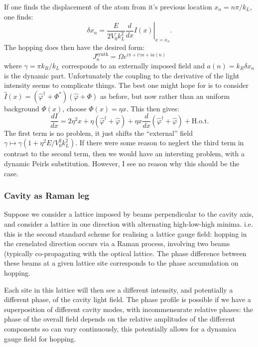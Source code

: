 \documentclass[twocolumn]{revtex4-1}
\begin{document}
If one finds the displacement of the atom from it's previous
location $x_n = n \pi/k_L$, one finds:
\begin{displaymath}
  \delta x_n = \frac{E}{2 V_0 k_L^2} \left. \frac{d}{dx} I(x)\right|_{x=x_n}.
\end{displaymath}
The hopping does then have  the desired form:
\begin{displaymath}
  J^{\text{synth}}_n
  =
  \Omega e^{i\pi+i \gamma n + i a(n)}
\end{displaymath}
where $\gamma=\pi k_R/k_L$ corresponds to an externally imposed field
and $a(n) = k_R \delta x_n$ is the dynamic part.  Unfortunately the
coupling to the derivative of the light intensity seems to complicate
things.  The best one might hope for is to consider $\hat{I}(x)
=(\hat\varphi^\dagger + \Phi^\ast) (\hat\varphi + \Phi)$ as before,
but now rather than an uniform background $\Phi(x)$, choose $\Phi(x) =
\eta x$.  This then gives:
\begin{displaymath}
  \frac{d I}{dx} = 2 \eta^2 x
  + \eta ( \hat\varphi^\dagger +\hat\varphi)
  + \eta x
  \frac{d }{dx} ( \hat\varphi^\dagger +\hat\varphi) + \text{H.o.t}.
\end{displaymath}
The first term is no problem, it just shifts the ``external'' field
$\gamma \mapsto \gamma(1 + \eta^2 E/ V_0^2 k_L^2)$.  If there were
some reason to neglect the third term in contrast to the second term,
then we would have an intersting problem, with a dynamic Peirls
substitution.  However, I see no reason why this should
be the case.

\subsubsection{Cavity as Raman leg}
\label{sec:cavity-as-raman}

Suppose we consider a lattice imposed by beams perpendicular to the
cavity axis, and consider a lattice in one direction with alternating
high-low-high minima.  i.e. this is the second standard scheme for
realising a lattice gauge field: hopping in the crenelated direction
occurs via a Raman process, involving two beams (typically
co-propagating with the optical lattice.  The phase difference between
these beams at a given lattice site corresponds to the phase
accumulation on hopping.

Each site in this lattice will then see a different intensity, and
potentially a different phase, of the cavity light field.  The phase
profile is possible if we have a superposition of different cavity
modes, with incommensurate relative phases: the phase of the overall
field depends on the relative amplitudes of the different components
so can vary continuously, this potentially allows for a dynamica
gauge field for hopping.
\end{document}
